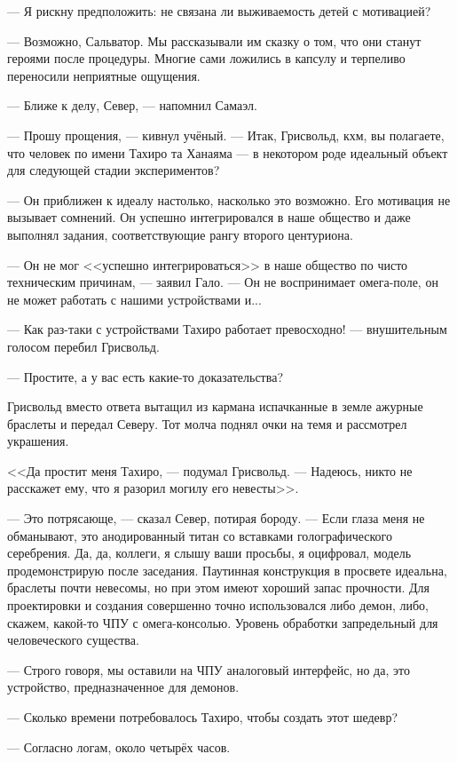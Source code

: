 --- Я рискну предположить: не связана ли выживаемость детей с мотивацией?

--- Возможно, Сальватор.
Мы рассказывали им сказку о том, что они станут героями после процедуры.
Многие сами ложились в капсулу и терпеливо переносили неприятные ощущения.

--- Ближе к делу, Север, --- напомнил Самаэл.

--- Прошу прощения, --- кивнул учёный.
--- Итак, Грисвольд, кхм, вы полагаете, что человек по имени Тахиро та Ханаяма --- в некотором роде идеальный объект для следующей стадии экспериментов?

--- Он приближен к идеалу настолько, насколько это возможно.
Его мотивация не вызывает сомнений.
Он успешно интегрировался в наше общество и даже выполнял задания, соответствующие рангу второго центуриона.

--- Он не мог <<успешно интегрироваться>> в наше общество по чисто техническим причинам, --- заявил Гало.
--- Он не воспринимает омега-поле, он не может работать с нашими устройствами и...

--- Как раз-таки с устройствами Тахиро работает превосходно! --- внушительным голосом перебил Грисвольд.

--- Простите, а у вас есть какие-то доказательства?

Грисвольд вместо ответа вытащил из кармана испачканные в земле ажурные браслеты и передал Северу.
Тот молча поднял очки на темя и рассмотрел украшения.

<<Да простит меня Тахиро, --- подумал Грисвольд.
--- Надеюсь, никто не расскажет ему, что я разорил могилу его невесты>>.

--- Это потрясающе, --- сказал Север, потирая бороду.
--- Если глаза меня не обманывают, это анодированный титан со вставками голографического серебрения.
Да, да, коллеги, я слышу ваши просьбы, я оцифровал, модель продемонстрирую после заседания.
Паутинная конструкция в просвете идеальна, браслеты почти невесомы, но при этом имеют хороший запас прочности.
Для проектировки и создания совершенно точно использовался либо демон, либо, скажем, какой-то ЧПУ с омега-консолью.
Уровень обработки запредельный для человеческого существа.

--- Строго говоря, мы оставили на ЧПУ аналоговый интерфейс, но да, это устройство, предназначенное для демонов.

--- Сколько времени потребовалось Тахиро, чтобы создать этот шедевр?

--- Согласно логам, около четырёх часов.

